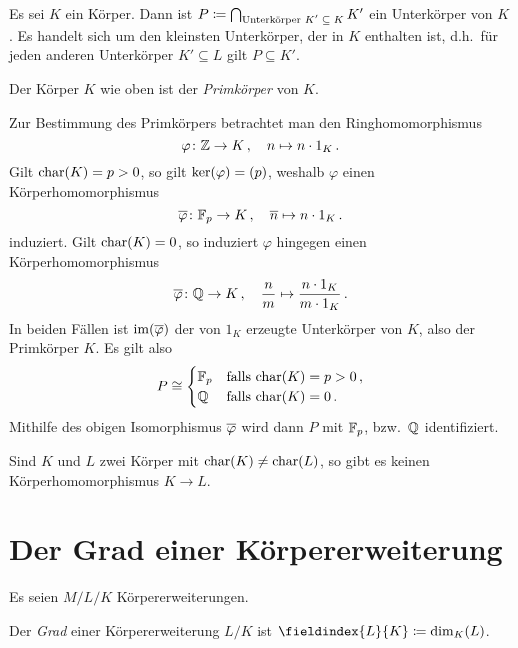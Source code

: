 Es sei $K$ ein Körper.
Dann ist $P \coloneqq \bigcap_{\text{Unterkörper $K' \subseteq K$}} K'$ ein Unterkörper von $K$.
Es handelt sich um den kleinsten Unterkörper, der in $K$ enthalten ist, d.h.\ für jeden anderen Unterkörper $K' \subseteq L$ gilt $P \subseteq K'$.

\begin{definition}
  Der Körper $K$ wie oben ist der \emph{Primkörper} von $K$.
\end{definition}

Zur Bestimmung des Primkörpers betrachtet man den Ringhomomorphismus
\[
          \varphi
  \colon  \mathbb{Z}
  \to     K \,,
  \quad   n
  \mapsto n \cdot 1_K \,.
\]
Gilt $\operatorname{char}(K) = p > 0$, so gilt $\ker(\varphi) = (p)$, weshalb $\varphi$ einen Körperhomomorphismus
\[
          \overline{\varphi}
  \colon  \mathbb{F}_p
  \to     K \,,
  \quad   \overline{n}
  \mapsto n \cdot 1_K \,.
\]
induziert.
Gilt $\operatorname{char}(K) = 0$, so induziert $\varphi$ hingegen einen Körperhomomorphismus
\[
          \overline{\varphi}
  \colon  \mathbb{Q}
  \to     K \,,
  \quad   \frac{n}{m}
  \mapsto \frac{n \cdot 1_K}{m \cdot 1_K} \,.
\]
In beiden Fällen ist $\operatorname{im}(\overline{\varphi})$ der von $1_K$ erzeugte Unterkörper von $K$, also der Primkörper $K$.
Es gilt also
\[
          P
  \cong \begin{cases}
          \mathbb{F}_p & \text{falls $\operatorname{char}(K) = p > 0$} \,, \\
          \mathbb{Q} & \text{falls $\operatorname{char}(K) = 0$} \,.
        \end{cases}
\]
Mithilfe des obigen Isomorphismus $\overline{\varphi}$ wird dann $P$ mit $\mathbb{F}_p$, bzw.\ $\mathbb{Q}$ identifiziert.

\begin{corollary}
  Sind $K$ und $L$ zwei Körper mit $\operatorname{char}(K) \neq \operatorname{char}(L)$, so gibt es keinen Körperhomomorphismus $K \to L$.
\end{corollary}





\section{Der Grad einer Körpererweiterung}

Es seien $M/L/K$ Körpererweiterungen.

\begin{definition}
  Der \emph{Grad} einer Körpererweiterung $L/K$ ist $\fieldindex{L}{K} \defined \dim_K(L)$.
\end{definition}

